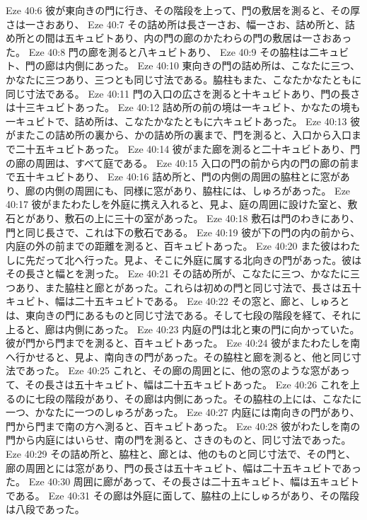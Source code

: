 Eze 40:6  彼が東向きの門に行き、その階段を上って、門の敷居を測ると、その厚さは一さおあり、
Eze 40:7  その詰め所は長さ一さお、幅一さお、詰め所と、詰め所との間は五キュビトあり、内の門の廊のかたわらの門の敷居は一さおあった。
Eze 40:8  門の廊を測ると八キュビトあり、
Eze 40:9  その脇柱は二キュビト、門の廊は内側にあった。
Eze 40:10  東向きの門の詰め所は、こなたに三つ、かなたに三つあり、三つとも同じ寸法である。脇柱もまた、こなたかなたともに同じ寸法である。
Eze 40:11  門の入口の広さを測ると十キュビトあり、門の長さは十三キュビトあった。
Eze 40:12  詰め所の前の境は一キュビト、かなたの境も一キュビトで、詰め所は、こなたかなたともに六キュビトあった。
Eze 40:13  彼がまたこの詰め所の裏から、かの詰め所の裏まで、門を測ると、入口から入口まで二十五キュビトあった。
Eze 40:14  彼がまた廊を測ると二十キュビトあり、門の廊の周囲は、すべて庭である。
Eze 40:15  入口の門の前から内の門の廊の前まで五十キュビトあり、
Eze 40:16  詰め所と、門の内側の周囲の脇柱とに窓があり、廊の内側の周囲にも、同様に窓があり、脇柱には、しゅろがあった。
Eze 40:17  彼がまたわたしを外庭に携え入れると、見よ、庭の周囲に設けた室と、敷石とがあり、敷石の上に三十の室があった。
Eze 40:18  敷石は門のわきにあり、門と同じ長さで、これは下の敷石である。
Eze 40:19  彼が下の門の内の前から、内庭の外の前までの距離を測ると、百キュビトあった。
Eze 40:20  また彼はわたしに先だって北へ行った。見よ、そこに外庭に属する北向きの門があった。彼はその長さと幅とを測った。
Eze 40:21  その詰め所が、こなたに三つ、かなたに三つあり、また脇柱と廊とがあった。これらは初めの門と同じ寸法で、長さは五十キュビト、幅は二十五キュビトである。
Eze 40:22  その窓と、廊と、しゅろとは、東向きの門にあるものと同じ寸法である。そして七段の階段を経て、それに上ると、廊は内側にあった。
Eze 40:23  内庭の門は北と東の門に向かっていた。彼が門から門までを測ると、百キュビトあった。
Eze 40:24  彼がまたわたしを南へ行かせると、見よ、南向きの門があった。その脇柱と廊を測ると、他と同じ寸法であった。
Eze 40:25  これと、その廊の周囲とに、他の窓のような窓があって、その長さは五十キュビト、幅は二十五キュビトあった。
Eze 40:26  これを上るのに七段の階段があり、その廊は内側にあった。その脇柱の上には、こなたに一つ、かなたに一つのしゅろがあった。
Eze 40:27  内庭には南向きの門があり、門から門まで南の方へ測ると、百キュビトあった。
Eze 40:28  彼がわたしを南の門から内庭にはいらせ、南の門を測ると、さきのものと、同じ寸法であった。
Eze 40:29  その詰め所と、脇柱と、廊とは、他のものと同じ寸法で、その門と、廊の周囲とには窓があり、門の長さは五十キュビト、幅は二十五キュビトであった。
Eze 40:30  周囲に廊があって、その長さは二十五キュビト、幅は五キュビトである。
Eze 40:31  その廊は外庭に面して、脇柱の上にしゅろがあり、その階段は八段であった。
